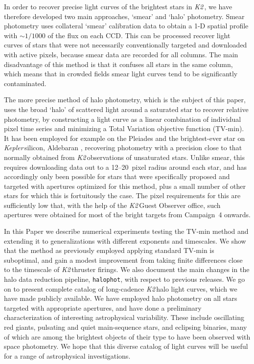 \documentclass[modern]{aastex62}
\newcommand\kepler{\emph{Kepler}\,}
\newcommand\ktwo{\emph{K2}\,}
\begin{document}
In order to recover precise light curves of the brightest stars in \ktwo, we have therefore developed two main approaches, `smear' and `halo' photometry. Smear photometry \citep{Pope2016} uses collateral `smear' calibration data to obtain a 1-D spatial profile with $\sim 1/1000$ of the flux on each CCD. This can be processed recover light curves of stars that were not necessarily conventionally targeted and downloaded with active pixels, because smear data are recorded for all columns. The main disadvantage of this method is that it confuses all stars in the same column, which means that in crowded fields smear light curves tend to be significantly contaminated. 

The more precise method of halo photometry, which is the subject of this paper, uses the broad `halo' of scattered light around a saturated star to recover relative photometry, by constructing a light curve as a linear combination of individual pixel time series and minimizing a Total Variation objective function (TV-min). It has been employed for example on the Pleiades \citep{White2017} and the brightest-ever star on \kepler silicon, Aldebaran \citep[$\alpha$\,Tau;][]{Farr2018}, recovering photometry with a precision close to that normally obtained from \ktwo observations of unsaturated stars. Unlike smear, this requires downloading data out to a 12--20~pixel radius around each star, and has accordingly only been possible for stars that were specifically proposed and targeted with apertures optimized for this method, plus a small number of other stars for which this is fortuitously the case. The pixel requirements for this are sufficiently low that, with the help of the \ktwo Guest Observer office, such apertures were obtained for most of the bright targets from Campaign~4 onwards.

In this Paper we describe numerical experiments testing the TV-min method and extending it to generalizations with different exponents and timescales. We show that the method as previously employed applying standard TV-min is suboptimal, and gain a modest improvement from taking finite differences close to the timescale of \ktwo thruster firings. We also document the main changes in the halo data reduction pipeline, \texttt{halophot}, with respect to previous releases. 
We go on to present complete catalog of long-cadence \ktwo halo light curves, which we have made publicly available. We have employed halo photometry on all stars targeted with appropriate apertures, and have done a preliminary characterization of interesting astrophysical variability. These include oscillating red giants, pulsating and quiet main-sequence stars, and eclipsing binaries, many of which are among the brightest objects of their type to have been observed with space photometry. We hope that this diverse catalog of light curves will be useful for a range of astrophysical investigations. 
\end{document}

